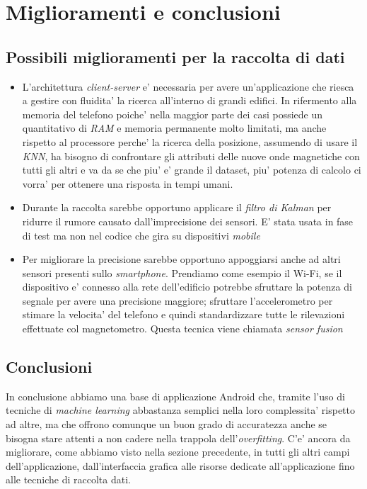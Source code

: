 \chapter{Miglioramenti e conclusioni}
\section{Possibili miglioramenti per la raccolta di dati}
\begin{itemize}
	\item L'architettura \textit{client-server} e' necessaria per avere un'applicazione che riesca a gestire con fluidita' la ricerca all'interno di grandi edifici. In rifermento alla memoria del telefono poiche' nella maggior parte dei casi possiede un quantitativo di \textit{RAM} e memoria permanente molto limitati, ma anche rispetto al processore perche' la ricerca della posizione, assumendo di usare il \textit{KNN}, ha bisogno di confrontare gli attributi delle nuove onde magnetiche con tutti gli altri e va da se che piu' e' grande il dataset, piu' potenza di calcolo ci vorra' per ottenere una risposta in tempi umani.
	\item Durante la raccolta sarebbe opportuno applicare il \textit{filtro di Kalman} per ridurre il rumore causato dall'imprecisione dei sensori. E' stata usata in fase di test ma non nel codice che gira su dispositivi \textit{mobile}
	\item Per migliorare la precisione sarebbe opportuno appoggiarsi anche ad altri sensori presenti sullo \textit{smartphone}. Prendiamo come esempio il Wi-Fi, se il dispositivo e' connesso alla rete dell'edificio potrebbe sfruttare la potenza di segnale per avere una precisione maggiore; sfruttare l'accelerometro per stimare la velocita' del telefono e quindi standardizzare tutte le rilevazioni effettuate col magnetometro. Questa tecnica viene chiamata \textit{sensor fusion}\cite{shala2011indoor}
\end{itemize}
\section{Conclusioni}
In conclusione abbiamo una base di applicazione Android che, tramite l'uso di tecniche di \textit{machine learning} abbastanza semplici nella loro complessita' rispetto ad altre, ma che offrono comunque un buon grado di accuratezza anche se bisogna stare attenti a non cadere nella trappola dell'\textit{overfitting}. C'e' ancora da migliorare, come abbiamo visto nella sezione precedente, in tutti gli altri campi dell'applicazione, dall'interfaccia grafica alle risorse dedicate all'applicazione fino alle tecniche di raccolta dati.